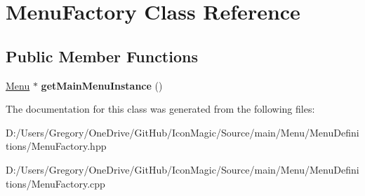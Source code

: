 \hypertarget{class_menu_factory}{}\section{Menu\+Factory Class Reference}
\label{class_menu_factory}
\subsection*{Public Member Functions}
\begin{DoxyCompactItemize}
\item 
\hypertarget{class_menu_factory_a7741d0ab75b28c6a8374f4cb0adf9872}{}\hyperlink{class_menu}{Menu} $\ast$ {\bfseries get\+Main\+Menu\+Instance} ()\label{class_menu_factory_a7741d0ab75b28c6a8374f4cb0adf9872}

\end{DoxyCompactItemize}


The documentation for this class was generated from the following files\+:\begin{DoxyCompactItemize}
\item 
D\+:/\+Users/\+Gregory/\+One\+Drive/\+Git\+Hub/\+Icon\+Magic/\+Source/main/\+Menu/\+Menu\+Definitions/Menu\+Factory.\+hpp\item 
D\+:/\+Users/\+Gregory/\+One\+Drive/\+Git\+Hub/\+Icon\+Magic/\+Source/main/\+Menu/\+Menu\+Definitions/Menu\+Factory.\+cpp\end{DoxyCompactItemize}
